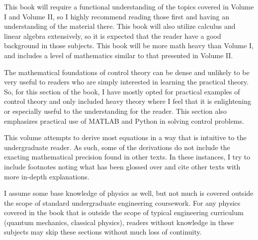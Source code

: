 This book will require a functional understanding of the topics covered in Volume I and Volume II, so I highly recommend reading those first and having an understanding of the material there. This book will also utilize calculus and linear algebra extensively, so it is expected that the reader have a good background in those subjects. This book will be more math heavy than Volume I, and includes a level of mathematics similar to that presented in Volume II. 

The mathematical foundations of control theory can be dense and unlikely to be very useful to readers who are simply interested in learning the practical theory. So, for this section of the book, I have mostly opted for practical examples of control theory and only included heavy theory where I feel that it is enlightening or especially useful to the understanding for the reader. This section also emphasizes practical use of MATLAB and Python in solving control problems.

This volume attempts to derive most equations in a way that is intuitive to the undergraduate reader. As such, some of the derivations do not include the exacting mathematical precision found in other texts. In these instances, I try to include footnotes noting what has been glossed over and cite other texts with more in-depth explanations.

I assume some base knowledge of physics as well, but not much is covered outside the scope of standard undergraduate engineering coursework. For any physics covered in the book that is outside the scope of typical engineering curriculum (quantum mechanics, classical physics), readers without knowledge in these subjects may skip these sections without much loss of continuity.